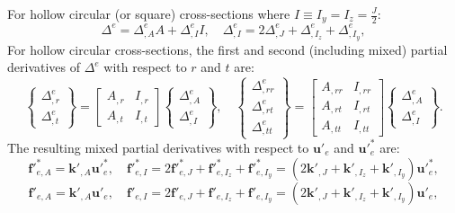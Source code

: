 \documentclass[12pt,a4paper,article]{memoir} %
\begin{document}
For hollow circular (or square) cross-sections where $I \equiv I_y = I_z = \frac{J}{2}$:
\begin{equation}
  \Delta^e = \Delta^e_{,A} A + \Delta^e_{,I} I, \quad \Delta^e_{,I} = 2 \Delta^e_{,J} + \Delta^e_{,I_z} + \Delta^e_{,I_y},
\end{equation}
For hollow circular cross-sections, the first and second (including mixed) partial derivatives of $\Delta^e$ with respect to $r$ and $t$ are:
\begin{equation}
  \left\{ \begin{array}{c} \Delta^e_{,r} \\ \Delta^e_{,t} \end{array} \right\} = \left[ \begin{array}{cc} A_{,r} & I_{,r} \\ A_{,t} & I_{,t} \end{array} \right] \left\{ \begin{array}{c} \Delta^e_{,A} \\ \Delta^e_{,I} \end{array} \right\}, \quad
  \left\{ \begin{array}{c} \Delta^e_{,rr} \\ \Delta^e_{,rt} \\ \Delta^e_{,tt} \end{array} \right\} = \left[ \begin{array}{cc} A_{,rr} & I_{,rr} \\ A_{,rt} & I_{,rt}  \\ A_{,tt} & I_{,tt} \end{array} \right] \left\{ \begin{array}{c} \Delta^e_{,A} \\ \Delta^e_{,I} \end{array} \right\}.
\end{equation}
The resulting mixed partial derivatives with respect to $\mathbf{u}'_e$ and $\mathbf{u}'^*_e$ are:
\begin{equation}
  \mathbf{f}'^*_{e,A} = \mathbf{k}'_{,A} \mathbf{u}'^*_e, \quad
  \mathbf{f}'^*_{e,I} = 2 \mathbf{f}'^*_{e,J} + \mathbf{f}'^*_{e,I_z} + \mathbf{f}'^*_{e,I_y} = \left( 2 \mathbf{k}'_{,J} + \mathbf{k}'_{,I_z} + \mathbf{k}'_{,I_y} \right) \mathbf{u}'^*_e,
\end{equation}
\begin{equation}
  \mathbf{f}'_{e,A} = \mathbf{k}'_{,A} \mathbf{u}'_e, \quad
  \mathbf{f}'_{e,I} = 2 \mathbf{f}'_{e,J} + \mathbf{f}'_{e,I_z} + \mathbf{f}'_{e,I_y} = \left( 2 \mathbf{k}'_{,J} + \mathbf{k}'_{,I_z} + \mathbf{k}'_{,I_y} \right) \mathbf{u}'_e,
\end{equation}
\end{document}
